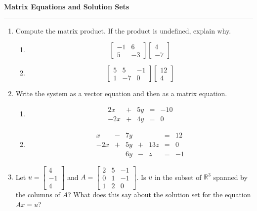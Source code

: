 \documentclass[12pt]{article}
\begin{document}
\begin{center}
{\bf \Large Matrix Equations and Solution Sets}
\vspace{0.2cm}
\hrule
\end{center}

\begin{multicols*}{2}
	\begin{enumerate}
		\item Compute the matrix product. If the product is undefined, explain why.
		\begin{enumerate}
			\item \[
			\begin{bmatrix}
				-1 & 6\\
				5 & -3
			\end{bmatrix}\begin{bmatrix}
				4\\-7
			\end{bmatrix}
			\]

			\vfill

			\item \[
			\begin{bmatrix}
				5 & 5 & -1\\
				1 & -7 & 0
			\end{bmatrix}
			\begin{bmatrix}
				12\\4
			\end{bmatrix}
			\]

			\vfill
		\end{enumerate}

		\item Write the system as a vector equation and then as a matrix equation.
		\begin{enumerate}
			\item \[
			\begin{array}{rcrcr}
				2x & + & 5y & = & -10\\
				-2x & + & 4y & = & 0
			\end{array}
			\]
			\vfill

			\item \[
			\begin{array}{rcrcrcr}
				x & - & 7y & &&=&12\\
				-2x & + & 5y & + & 13z & =& 0\\
				&&6y & - & z & = & -1
			\end{array}
			\]
			\vfill
		\end{enumerate}

		\item Let $u = \begin{bmatrix}
			4\\-1\\4
		\end{bmatrix}$ and $A = \begin{bmatrix}
			2 & 5 & -1\\
			0 & 1 & -1\\
			1 & 2 & 0
		\end{bmatrix}$. Is $u$ in the subset of $\mathbb{R}^3$ spanned by the columns of $A$? What does this say about the solution set for the equation $Ax = u$?
		\vfill\null\columnbreak


\end{enumerate}
\end{multicols*}
\end{document}
